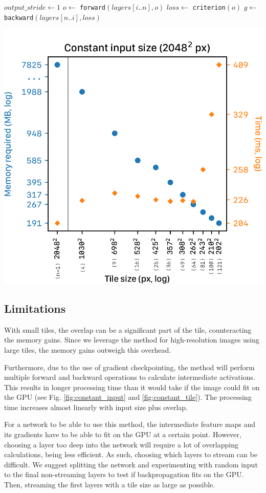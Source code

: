 \documentclass[
  12pt,
  a5,margin=2cmpaper,
]{article}
\begin{document}
\(output\_stride\gets 1\) \(o\gets\)
\texttt{forward}\((layers[i..n], o)\) \(loss\gets\)
\texttt{criterion}\((o)\) \(g\gets\)
\texttt{backward}\((layers[n..i], loss)\)

\includegraphics{chpt2_imgs/constant_input_size.png}\\

\hypertarget{limitations}{%
\subsection{Limitations}\label{limitations}}

With small tiles, the overlap can be a significant part of the tile,
counteracting the memory gains. Since we leverage the method for
high-resolution images using large tiles, the memory gains outweigh this
overhead.

Furthermore, due to the use of gradient checkpointing, the method will
perform multiple forward and backward operations to calculate
intermediate activations. This results in longer processing time than it
would take if the image could fit on the GPU (see Fig.
\protect\hyperlink{fig:constant_input}{{[}fig:constant\_input{]}} and
\protect\hyperlink{fig:constant_tile}{{[}fig:constant\_tile{]}}). The
processing time increases almost linearly with input size plus overlap.

For a network to be able to use this method, the intermediate feature
maps and its gradients have to be able to fit on the GPU at a certain
point. However, choosing a layer too deep into the network will require
a lot of overlapping calculations, being less efficient. As such,
choosing which layers to stream can be difficult. We suggest splitting
the network and experimenting with random input to the final
non-streaming layers to test if backpropagation fits on the GPU. Then,
streaming the first layers with a tile size as large as possible.
\end{document}
